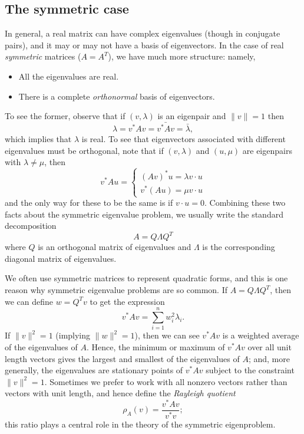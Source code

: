 \subsection{The symmetric case}

In general, a real matrix can have complex eigenvalues (though in
conjugate pairs), and it may or may not have a basis of eigenvectors.
In the case of real {\em symmetric} matrices ($A = A^T$), we have
much more structure: namely,
\begin{itemize}
\item All the eigenvalues are real.
\item There is a complete {\em orthonormal} basis of eigenvectors.
\end{itemize}
To see the former, observe that if $(v, \lambda)$ is an eigenpair
and $\|v\| = 1$ then
\[
  \lambda = v^* A v = \bar{v^* A v} = \bar{\lambda},
\]
which implies that $\lambda$ is real.  To see that eigenvectors
associated with different eigenvalues must be orthogonal, note
that if $(v,\lambda)$ and $(u,\mu)$ are eigenpairs with $\lambda \neq
\mu$, then
\[
v^* A u = \begin{cases}
  (A v)^* u = \lambda v \cdot u \\
  v^* (Au) = \mu v \cdot u
\end{cases}
\]
and the only way for these to be the same is if $v \cdot u = 0$.
Combining these two facts about the symmetric eigenvalue problem,
we usually write the standard decomposition
\[
  A = Q \Lambda Q^T
\]
where $Q$ is an orthogonal matrix of eigenvalues
and $\Lambda$ is the corresponding diagonal matrix of eigenvalues.

We often use symmetric matrices to represent quadratic forms,
and this is one reason why symmetric eigenvalue problems are
so common.  If $A = Q \Lambda Q^T$, then we can define $w = Q^T v$
to get the expression
\[
  v^* A v = \sum_{i=1}^n w_i^2 \lambda_i.
\]
If $\|v\|^2 = 1$ (implying $\|w\|^2 = 1$), then we can see $v^* A v$ is a
weighted average of the eigenvalues of $A$.  Hence, the minimum or
maximum of $v^* A v$ over all unit length vectors gives the largest
and smallest of the eigenvalues of $A$; and, more generally, the
eigenvalues are stationary points of $v^* A v$ subject to the
constraint $\|v\|^2 = 1$.  Sometimes we prefer to work with all nonzero
vectors rather than vectors with unit length, and hence define the
{\em Rayleigh quotient}
\[
  \rho_A(v) = \frac{v^* A v}{v^* v};
\]
this ratio plays a central role in the theory of the symmetric eigenproblem.
